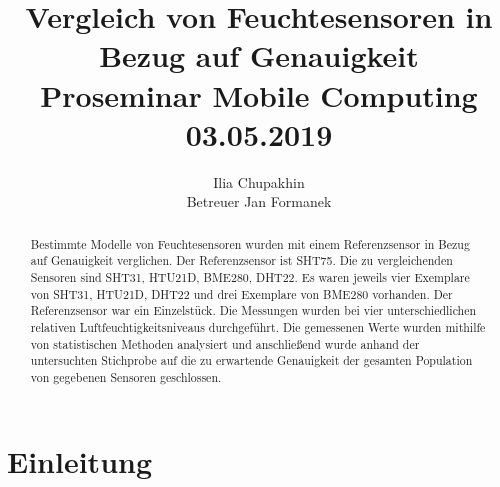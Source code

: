 \documentclass[runningheads]{llncs}
\begin{document}
\title{Vergleich von Feuchtesensoren in Bezug auf Genauigkeit\\Proseminar Mobile Computing
\\03.05.2019}

%
\author{Ilia Chupakhin\\Betreuer Jan Formanek}

%


%
\maketitle              %
%
\begin{abstract}
Bestimmte Modelle von Feuchtesensoren wurden mit einem Referenzsensor in Bezug auf Genauigkeit verglichen. Der Referenzsensor ist SHT75. Die zu vergleichenden Sensoren sind SHT31, HTU21D, BME280, DHT22. Es waren jeweils vier Exemplare von SHT31, HTU21D, DHT22 und drei Exemplare von BME280 vorhanden. Der Referenzsensor war ein Einzelstück. Die Messungen wurden bei vier unterschiedlichen relativen Luftfeuchtigkeitsniveaus durchgeführt. Die gemessenen Werte wurden mithilfe von statistischen Methoden analysiert und anschließend wurde anhand der untersuchten Stichprobe auf die zu erwartende Genauigkeit der gesamten Population von gegebenen Sensoren geschlossen.    

\end{abstract}
%
%
%
\section{Einleitung}
\end{document}
